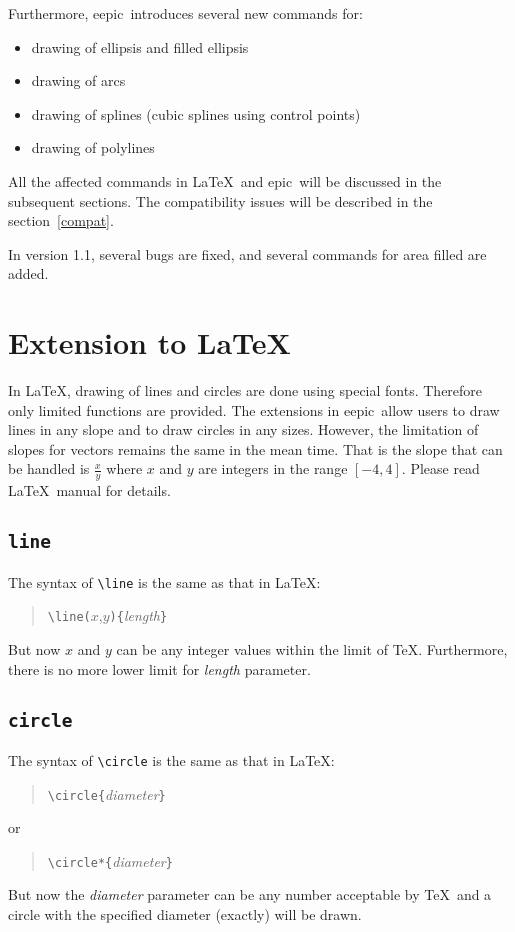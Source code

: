 \documentclass[11pt]{article}
\newcommand{\epic}{{\sc epic}}
\newcommand{\eepic}{{\sc eepic}}
\begin{document}
Furthermore, \eepic\ introduces several new commands for:
\begin{itemize}\parskip=0pt
\item drawing of ellipsis and filled ellipsis
\item drawing of arcs
\item drawing of splines (cubic splines using control points)
\item drawing of polylines
\end{itemize}

All the affected commands in \LaTeX\ and \epic\ will be discussed
in the subsequent sections. The compatibility issues will be
described in the section~\ref{compat}.

In version 1.1, several bugs are fixed, and several commands for
area filled are added.
\clearpage


\section{Extension to \LaTeX}

In \LaTeX, drawing of lines and circles are done using special
fonts. Therefore only limited functions are provided. The
extensions in \eepic\ allow users to draw lines in any slope and
to draw circles in any sizes. However, the limitation of slopes
for vectors remains the same in the mean time. That is the slope
that can be handled is $\frac{x}{y}$ where $x$ and $y$ are
integers in the range $[-4,4]$. Please read \LaTeX\ manual for
details.


\subsection{\tt \BS line}
The syntax of \verb|\line| is the same as that in \LaTeX:
\begin{quote}
\verb|\line(|$x$,$y$\verb|){|{\em length}\verb|}|
\end{quote}
But now $x$ and $y$ can be any integer values within the limit of
\TeX. Furthermore, there is no more lower limit for {\em length}
parameter.


\subsection{\tt \BS circle}
The syntax of \verb|\circle| is the same as that in \LaTeX:
\begin{quote}
\verb|\circle{|{\em diameter}\verb|}|
\end{quote}
or
\begin{quote}
\verb|\circle*{|{\em diameter}\verb|}|
\end{quote}
But now the {\em diameter} parameter can be any number acceptable
by \TeX\ and a circle with the specified diameter (exactly) will
be drawn.
\end{document}
